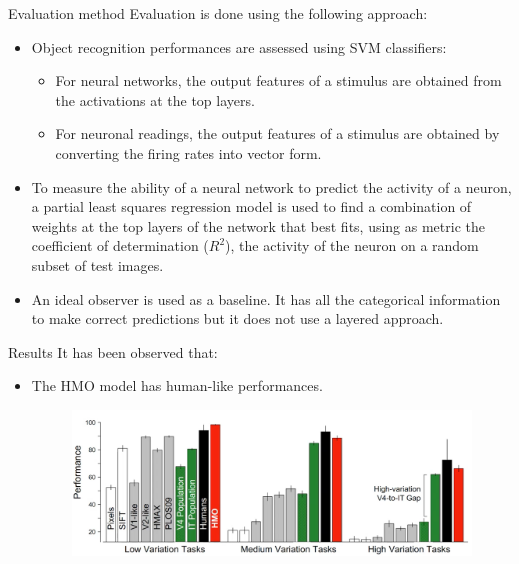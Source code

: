 \begin{casestudy}
\begin{descriptionlist}
        \item[Evaluation method]
            Evaluation is done using the following approach:
            \begin{itemize}
                \item Object recognition performances are assessed using SVM classifiers:
                    \begin{itemize}
                        \item For neural networks, the output features of a stimulus are obtained from the activations at the top layers.
                        \item For neuronal readings, the output features of a stimulus are obtained by converting the firing rates into vector form.
                    \end{itemize}
                
                \item To measure the ability of a neural network to predict the activity of a neuron,
                    a partial least squares regression model is used to find a combination of weights at the top layers of the network
                    that best fits, using as metric the coefficient of determination ($R^2$), the activity of the neuron on a random subset of test images.

                \item An ideal observer is used as a baseline.
                    It has all the categorical information to make correct predictions but it does not use a layered approach.
            \end{itemize}


        \item[Results]
            It has been observed that:
            \begin{itemize}
                \item The HMO model has human-like performances.
                    \begin{figure}[H]
                        \centering
                        \includegraphics[width=0.7\linewidth]{./img/vision_nn_performance_hmo.png}
                    \end{figure}


\end{itemize}
\end{descriptionlist}
\end{casestudy}
